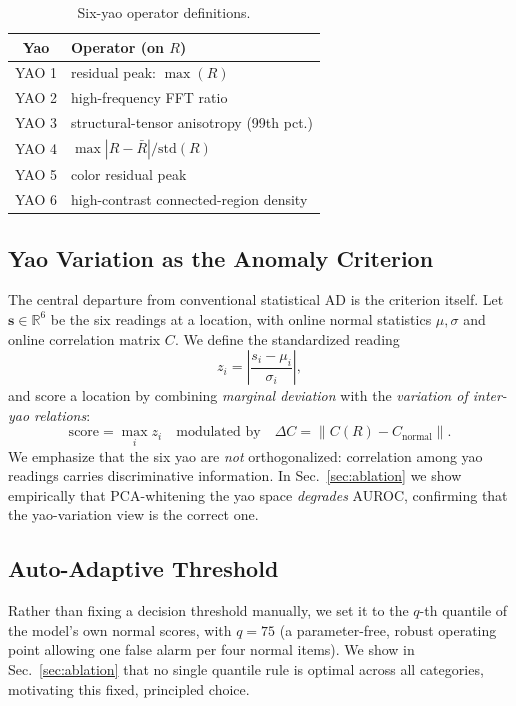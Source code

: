 \documentclass[preprint,12pt]{elsarticle}
\begin{document}
\begin{table}[t]
\centering
\caption{Six-yao operator definitions.}
\label{tab:yao}
\begin{tabular}{cl}
\toprule
Yao & Operator (on $R$) \\
\midrule
YAO 1 & residual peak: $\max(R)$ \\
YAO 2 & high-frequency FFT ratio \\
YAO 3 & structural-tensor anisotropy (99th pct.) \\
YAO 4 & $\max|R-\bar R| / \mathrm{std}(R)$ \\
YAO 5 & color residual peak \\
YAO 6 & high-contrast connected-region density \\
\bottomrule
\end{tabular}
\end{table}

\subsection{Yao Variation as the Anomaly Criterion}
\label{sec:yaobian}
The central departure from conventional statistical AD is the criterion
itself. Let $\mathbf{s} \in \mathbb{R}^6$ be the six readings at a
location, with online normal statistics $\mu, \sigma$ and online
correlation matrix $C$. We define the standardized reading
\begin{equation}
z_i = \left|\frac{s_i - \mu_i}{\sigma_i}\right|,
\end{equation}
and score a location by combining \emph{marginal deviation} with the
\emph{variation of inter-yao relations}:
\begin{equation}
\mathrm{score} = \max_i z_i \quad\text{modulated by}\quad
\Delta C = \|C(R) - C_{\text{normal}}\|.
\end{equation}
We emphasize that the six yao are \emph{not} orthogonalized: correlation
among yao readings carries discriminative information. In
Sec.~\ref{sec:ablation} we show empirically that PCA-whitening the yao
space \emph{degrades} AUROC, confirming that the yao-variation view is the
correct one.

\subsection{Auto-Adaptive Threshold}
Rather than fixing a decision threshold manually, we set it to the
$q$-th quantile of the model's own normal scores, with $q{=}75$
(a parameter-free, robust operating point allowing one false alarm per
four normal items). We show in Sec.~\ref{sec:ablation} that no single
quantile rule is optimal across all categories, motivating this fixed,
principled choice.
\end{document}
